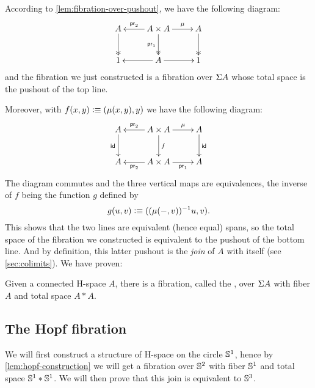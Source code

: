 According to \autoref{lem:fibration-over-pushout}, we have the following
diagram:
%
\[\xymatrix{A \ar@{->>}[d] & A \times A \ar[l]_-{\proj2} \ar@{->>}_{\proj1}[d]
  \ar[r]^-{\mu} & A \ar@{->>}[d] \\
  1 & A \ar[r] \ar[l] & 1}\]
%
and the fibration we just constructed is a fibration over $\Sigma A$ whose total
space is the pushout of the top line.

Moreover, with $f(x,y)\vcentcolon\equiv(\mu(x,y),y)$ we have the following diagram:
%
\[\xymatrix{A \ar_\idfunc[d] & A \times A \ar[l]_-{\proj2} \ar^f[d]
  \ar[r]^-{\mu} & A \ar^\idfunc[d] \\
  A & A\times A \ar^-{\proj2}[l] \ar_-{\proj1}[r] & A}\]
%
The diagram commutes and the three vertical maps are equivalences, the inverse
of $f$ being the function $g$ defined by
\[g(u,v)\vcentcolon\equiv((\mu(-,v))^{-1}u,v).\]
%
This shows that the two lines are equivalent (hence equal) spans, so the total
space of the fibration we constructed is equivalent to the pushout of the bottom
line.
And by definition, this latter pushout is the \emph{join} of $A$ with itself (see \autoref{sec:colimits}).
%
We have proven:

\begin{lem}\label{lem:hopf-construction}
  Given a connected H-space $A$, there is a fibration, called the
  ,
  over $\Sigma A$ with fiber $A$ and total space $A*A$.
\end{lem}

\subsection{The Hopf fibration}

We will first construct a structure of H-space on the circle $\mathbb{S}^1$, hence by
\autoref{lem:hopf-construction} we will get a fibration over $\mathbb{S}^2$ with fiber
$\mathbb{S}^1$ and total space $\mathbb{S}^1*\mathbb{S}^1$. We will then prove that this join is
equivalent to $\mathbb{S}^3$.

